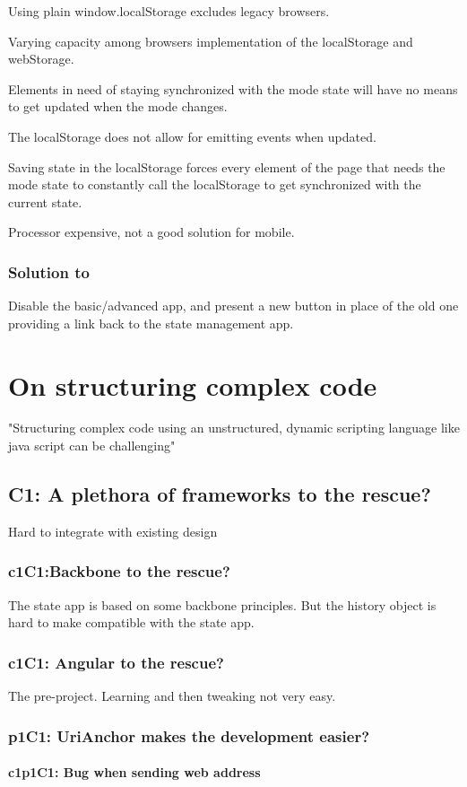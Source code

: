 \documentclass[english]{ifimaster}
\begin{document}
Using plain window.localStorage excludes legacy browsers.

Varying capacity among browsers implementation of the localStorage and webStorage.

Elements in need of staying synchronized with the mode state will have no means to get updated when the mode changes.

The localStorage does not allow for emitting events when updated.

Saving state in the localStorage forces every element of the page that needs the mode state to constantly call the localStorage to get synchronized with the current state.

Processor expensive, not a good solution for mobile.

\subsection{Solution to } 
Disable the basic/advanced app, and present a new button in place of the old one providing a link back to the state management app.

\chapter{On structuring complex code}
"Structuring complex code using an unstructured, dynamic scripting language like java script can be challenging"
\section{C1: A plethora of frameworks to the rescue?}
Hard to integrate with existing design
\subsection{c1C1:Backbone to the rescue?}
The state app is based on some backbone principles. But the history object is hard to make compatible with the state app. 
\subsection{c1C1: Angular to the rescue?}
The pre-project. Learning and then tweaking not very easy.
\subsection{p1C1: UriAnchor makes the development easier?}
\subsubsection{c1p1C1: Bug when sending web address}
\end{document}
